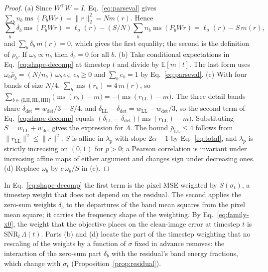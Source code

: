\begin{proof}
(a) Since $W^\top W = I$, Eq.~\eqref{eq:parseval} gives
$\sum_b n_b \operatorname{ms}(P_b W r) = \lVert r \rVert_2^2 = N m(r)$. Hence
\[
  \textstyle\sum_b \delta_b \operatorname{ms}(P_b W r)
  = \ell_\sigma(r) - (S/N)\sum_b n_b \operatorname{ms}(P_b W r)
  = \ell_\sigma(r) - S\,m(r),
\]
and $\sum_b \delta_b\, m(r) = 0$, which gives the first equality; the second is
the definition of $\rho_b$. If
$\omega_b \propto n_b$ then $\delta_b = 0$ for all $b$.
(b) Take conditional expectations in Eq.~\eqref{eq:shape-decomp} at timestep
$t$ and divide by $\mathbb{E}[m \mid t]$. The last form uses
$\omega_b \bar\rho_b = (N/n_b)\,\omega_b\, e_b$; $e_b \ge 0$ and
$\sum_b e_b = 1$ by Eq.~\eqref{eq:parseval}.
(c) With four bands of size $N/4$, $\sum_b \operatorname{ms}(r_b) = 4\,m(r)$, so
$\sum_{b \in \{\mathrm{LH},\mathrm{HL},\mathrm{HH}\}} \big(\operatorname{ms}(r_b) - m\big)
= -\big(\operatorname{ms}(r_{\mathrm{LL}}) - m\big)$. The three detail bands
share $\delta_{\det} = w_{\det}/3 - S/4$, and
$\delta_{\mathrm{LL}} - \delta_{\det} = w_{\mathrm{LL}} - w_{\det}/3$, so the
second term of Eq.~\eqref{eq:shape-decomp} equals
$(\delta_{\mathrm{LL}} - \delta_{\det})\big(\operatorname{ms}(r_{\mathrm{LL}}) - m\big)$.
Substituting $S = w_{\mathrm{LL}} + w_{\det}$ gives the expression for
$\Lambda$. The bound $\bar\rho_{\mathrm{LL}} \le 4$ follows from
$\lVert r_{\mathrm{LL}} \rVert^2 \le \lVert r \rVert^2$. $S$ is affine in
$\lambda_p$ with slope $2\alpha - 1$ by Eq.~\eqref{eq:total}, and $\lambda_p$
is strictly increasing on $(0,1)$ for $p > 0$; a Pearson correlation is
invariant under increasing affine maps of either argument and changes sign
under decreasing ones.
(d) Replace $\omega_b$ by $c\,\omega_b/S$ in (c).
\end{proof}

In Eq.~\eqref{eq:shape-decomp} the first term is the pixel MSE weighted by
$S(\sigma_t)$, a timestep weight that does not depend on the residual. The
second applies the zero-sum weights $\delta_b$ to the departures of the band
mean squares from the pixel mean square; it carries the frequency shape of the
weighting. By Eq.~\eqref{eq:family-x0}, the weight that the objective places on
the clean-image error at timestep $t$ is $\mathrm{SNR}_t\,\Lambda(t)$. Parts
(b) and (d) locate the part of the timestep weighting that no rescaling of the
weights by a function of $\sigma$ fixed in advance removes: the interaction of the zero-sum part $\delta_b$ with the
residual's band energy fractions, which change with $\sigma_t$
(Proposition~\ref{prop:residual}).

